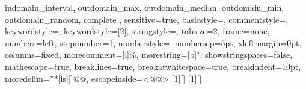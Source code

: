 {{  indomain_interval, outdomain_max, outdomain_median, outdomain_min,
  outdomain_random, complete
  },
  sensitive=true,
  basicstyle=\tiny,
  commentstyle=\color[rgb]{0.9,0.1,0.1},
  keywordstyle=\color[rgb]{0,0.5,0},
  keywordstyle=[2]\color{blue},
  stringstyle=\color{orange},
  tabsize=2,
  frame=none,
  numbers=left,
  stepnumber=1,
  numberstyle=\tiny,
  numbersep=5pt,
  xleftmargin=0pt, %
  columns=fixed, %
  morecomment=[l]{\%},
  morestring=[b]",
  showstringspaces=false,
  mathescape=true,
  breaklines=true,
  breakatwhitespace=true,
  breakindent=10pt, %
  moredelim=**[is][\color{Melon}]{@}{@},
  escapeinside={{<@}{@>}}
}
[1][]{\lstset{language=Mzn,#1}}{}
[1][]{\lstset{language=Mzn,numbers=none,xleftmargin=0pt,#1}}{}
\newcommand{\mzninline}[1]{\lstinline[{language=Mzn}]|#1|}
\newcommand{\mzninlinebar}[1]{\lstinline[{language=Mzn}]!#1!}

